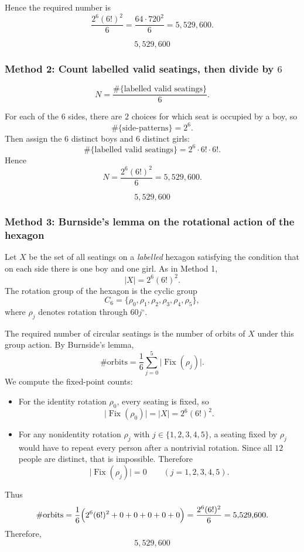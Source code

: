 \documentclass[12pt]{article}
\begin{document}
Hence the required number is
\[
\frac{2^6(6!)^2}{6}=\frac{64\cdot 720^2}{6}=5{,}529{,}600.
\]

\[
\boxed{5{,}529{,}600}
\]

\subsubsection{Method 2: Count labelled valid seatings, then divide by \(6\)}

\[
N=\frac{\#\{\text{labelled valid seatings}\}}{6}.
\]

For each of the \(6\) sides, there are \(2\) choices for which seat is occupied by a boy, so
\[
\#\{\text{side-patterns}\}=2^6.
\]
Then assign the \(6\) distinct boys and \(6\) distinct girls:
\[
\#\{\text{labelled valid seatings}\}=2^6\cdot 6!\cdot 6!.
\]
Hence
\[
N=\frac{2^6(6!)^2}{6}=5{,}529{,}600.
\]

\[
\boxed{5{,}529{,}600}
\]

\subsubsection{Method 3: Burnside's lemma on the rotational action of the hexagon}
Let $X$ be the set of all seatings on a \emph{labelled} hexagon satisfying the condition that on each side there is one boy and one girl. As in Method 1,
\[
|X|=2^6(6!)^2.
\]
The rotation group of the hexagon is the cyclic group
\[
C_6=\{\rho_0,\rho_1,\rho_2,\rho_3,\rho_4,\rho_5\},
\]
where $\rho_j$ denotes rotation through $60j^\circ$.

The required number of circular seatings is the number of orbits of $X$ under this group action. By Burnside's lemma,
\[
\#\text{orbits}=\frac{1}{6}\sum_{j=0}^{5}\bigl|\operatorname{Fix}(\rho_j)\bigr|.
\]
We compute the fixed-point counts:
\begin{itemize}[leftmargin=*]
  \item For the identity rotation $\rho_0$, every seating is fixed, so
  \[
  \bigl|\operatorname{Fix}(\rho_0)\bigr|=|X|=2^6(6!)^2.
  \]
  \item For any nonidentity rotation $\rho_j$ with $j\in\{1,2,3,4,5\}$, a seating fixed by $\rho_j$ would have to repeat every person after a nontrivial rotation. Since all $12$ people are distinct, that is impossible. Therefore
  \[
  \bigl|\operatorname{Fix}(\rho_j)\bigr|=0 \qquad (j=1,2,3,4,5).
  \]
\end{itemize}
Thus
\[
\#\text{orbits}=\frac{1}{6}\Bigl(2^6(6!)^2+0+0+0+0+0\Bigr)=\frac{2^6(6!)^2}{6}=5{,}529{,}600.
\]
Therefore,
\[
\boxed{5{,}529{,}600}
\]
\end{document}
